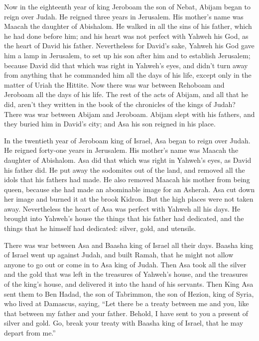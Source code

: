  Now in the eighteenth year of king Jeroboam the son of
Nebat, Abijam began to reign over Judah.  He reigned three
years in Jerusalem. His mother's name was Maacah the daughter of
Abishalom.  He walked in all the sins of his father, which
he had done before him; and his heart was not perfect with Yahweh his
God, as the heart of David his father.  Nevertheless for
David's sake, Yahweh his God gave him a lamp in Jerusalem, to set up his
son after him and to establish Jerusalem;  because David
did that which was right in Yahweh's eyes, and didn't turn away from
anything that he commanded him all the days of his life, except only in
the matter of Uriah the Hittite.  Now there was war
between Rehoboam and Jeroboam all the days of his life. 
The rest of the acts of Abijam, and all that he did, aren't they written
in the book of the chronicles of the kings of Judah? There was war
between Abijam and Jeroboam.  Abijam slept with his
fathers, and they buried him in David's city; and Asa his son reigned in
his place.

 In the twentieth year of Jeroboam king of Israel, Asa
began to reign over Judah.  He reigned forty-one years in
Jerusalem. His mother's name was Maacah the daughter of Abishalom.
 Asa did that which was right in Yahweh's eyes, as David
his father did.  He put away the sodomites out of the
land, and removed all the idols that his fathers had made.
 He also removed Maacah his mother from being queen,
because she had made an abominable image for an Asherah. Asa cut down
her image and burned it at the brook Kidron.  But the
high places were not taken away. Nevertheless the heart of Asa was
perfect with Yahweh all his days.  He brought into
Yahweh's house the things that his father had dedicated, and the things
that he himself had dedicated: silver, gold, and utensils.

 There was war between Asa and Baasha king of Israel all
their days.  Baasha king of Israel went up against Judah,
and built Ramah, that he might not allow anyone to go out or come in to
Asa king of Judah.  Then Asa took all the silver and the
gold that was left in the treasures of Yahweh's house, and the treasures
of the king's house, and delivered it into the hand of his servants.
Then King Asa sent them to Ben Hadad, the son of Tabrimmon, the son of
Hezion, king of Syria, who lived at Damascus, saying, 
``Let there be a treaty between me and you, like that between my father
and your father. Behold, I have sent to you a present of silver and
gold. Go, break your treaty with Baasha king of Israel, that he may
depart from me.''

